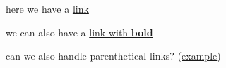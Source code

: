 
here we have a \href{www.yahoo.com}{link}

we can also have a \href{http://github.com}{link with \textbf{bold}}

can we also handle parenthetical links? (\href{www.yahoo.com}{example})

